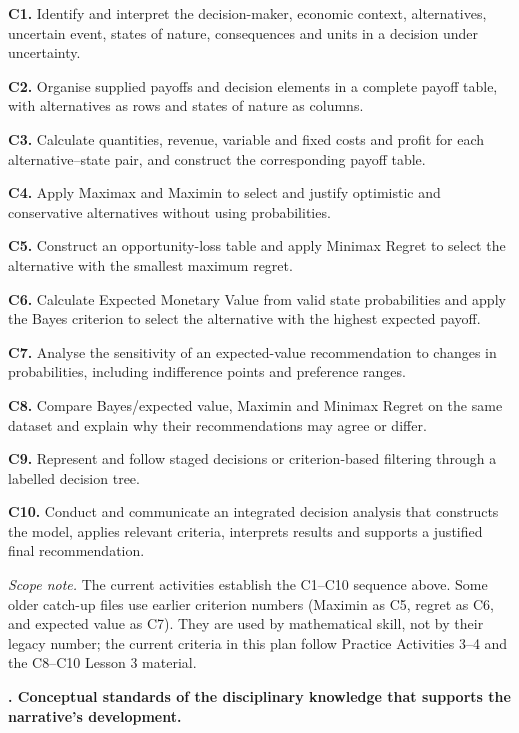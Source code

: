 \documentclass[10pt,letterpaper]{article}
\newcommand{\sectionbar}[1]{%
	\begin{tcolorbox}[
		enhanced,
		colback=sectionblue,
		colframe=sectionblue,
		boxrule=0pt,
		sharp corners,
		left=0.32in,
		right=0.08in,
		top=3.5pt,
		bottom=3.5pt,
		before skip=0pt,
		after skip=0pt,
		borderline north={1.15pt}{0pt}{black},
		borderline south={1.15pt}{0pt}{black}
		]
		\color{white}\bfseries\fontsize{12}{14}\selectfont #1
	\end{tcolorbox}%
}
\newcommand{\criterion}[2]{\textbf{C#1.} #2\par}
\begin{document}
	\begin{minipage}[t]{0.67\textwidth}
		\begin{bluebox}[valign=top]
			\fontsize{7.55}{9.55}\selectfont
			\criterion{1}{Identify and interpret the decision-maker, economic context, alternatives, uncertain event, states of nature, consequences and units in a decision under uncertainty.}
			\criterion{2}{Organise supplied payoffs and decision elements in a complete payoff table, with alternatives as rows and states of nature as columns.}
			\criterion{3}{Calculate quantities, revenue, variable and fixed costs and profit for each alternative--state pair, and construct the corresponding payoff table.}
			\criterion{4}{Apply Maximax and Maximin to select and justify optimistic and conservative alternatives without using probabilities.}
			\criterion{5}{Construct an opportunity-loss table and apply Minimax Regret to select the alternative with the smallest maximum regret.}
			\criterion{6}{Calculate Expected Monetary Value from valid state probabilities and apply the Bayes criterion to select the alternative with the highest expected payoff.}
			\criterion{7}{Analyse the sensitivity of an expected-value recommendation to changes in probabilities, including indifference points and preference ranges.}
			\criterion{8}{Compare Bayes/expected value, Maximin and Minimax Regret on the same dataset and explain why their recommendations may agree or differ.}
			\criterion{9}{Represent and follow staged decisions or criterion-based filtering through a labelled decision tree.}
			\criterion{10}{Conduct and communicate an integrated decision analysis that constructs the model, applies relevant criteria, interprets results and supports a justified final recommendation.}
			\textit{Scope note.} The current activities establish the C1--C10 sequence
			above. Some older catch-up files use earlier criterion numbers (Maximin as C5,
			regret as C6, and expected value as C7). They are used by mathematical skill,
			not by their legacy number; the current criteria in this plan follow Practice
			Activities 3--4 and the C8--C10 Lesson 3 material.
		\end{bluebox}
	\end{minipage}
	
	\newpage
	
	\sectionbar{3. Conceptual standards of the disciplinary knowledge that supports the narrative's development.}
	
\end{document}
